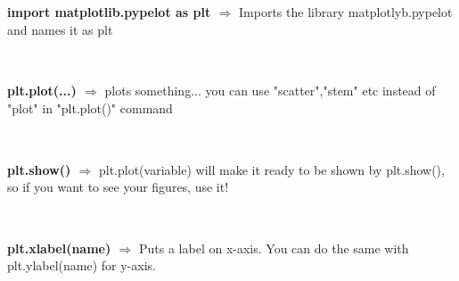 \documentclass[a4paper,18pt]{article}
\begin{document}
\section{\colorbox {Abi}{}}

\subsection{\colorbox {matgreen}{\color{white}{\large import matplotlib.pypelot as plt}}}
\textbf{import matplotlib.pypelot as plt $\Rightarrow$} Imports the library matplotlyb.pypelot and names it as plt\\\\


\subsection{\colorbox {matgreen}{\color{white}{\large plt.plot(...)}}}
\textbf{plt.plot(...) $\Rightarrow$} plots something... you can use "scatter","stem" etc instead of "plot" in "plt.plot()" command\\\\


\subsection{\colorbox {matgreen}{\color{white}{\large plt.show()}}}
\textbf{plt.show() $\Rightarrow$} plt.plot(variable) will make it ready to be shown by plt.show(), so if you want to see your figures, use it!\\\\


\subsection{\colorbox {matgreen}{\color{white}{\large plt.xlabel(name)}}}
\textbf{plt.xlabel(name) $\Rightarrow$} Puts a label on x-axis. You can do the same with plt.ylabel(name) for y-axis.\\\\
\end{document}
